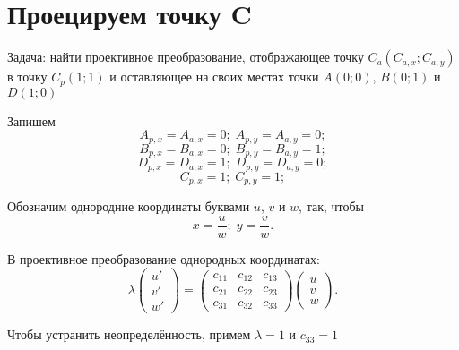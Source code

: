 \section{Проецируем точку C}

Задача: найти проективное преобразование, отображающее точку $C_a(C_{a,x};C_{a,y})$ в точку $C_p(1;1)$ и оставляющее на своих местах точки $A(0;0)$, $B(0;1)$ и $D(1;0)$

Запишем
$$ A_{p,x} = A_{a,x} = 0;\; A_{p,y} = A_{a,y} = 0;$$
$$ B_{p,x} = B_{a,x} = 0;\; B_{p,y} = B_{a,y} = 1;$$
$$ D_{p,x} = D_{a,x} = 1;\; D_{p,y} = D_{a,y} = 0;$$
$$ C_{p,x} = 1;\; C_{p,y} = 1;$$


Обозначим однородние координаты  буквами $u$, $v$ и $w$, так, чтобы
$$x = \frac{u}{w};\; y = \frac{v}{w}.$$


В проективное преобразование однородных координатах:
$$
\lambda
\begin{pmatrix}	u' \\ v' \\ w' \end{pmatrix}
= 
\begin{pmatrix}
	c_{11} & c_{12} & c_{13} \\
	c_{21} & c_{22} & c_{23} \\
	c_{31} & c_{32} & c_{33}
\end{pmatrix}
\begin{pmatrix}	u \\ v \\ w \end{pmatrix}
.
$$

Чтобы устранить неопределённость, примем $\lambda = 1$ и $c_{33} = 1$

